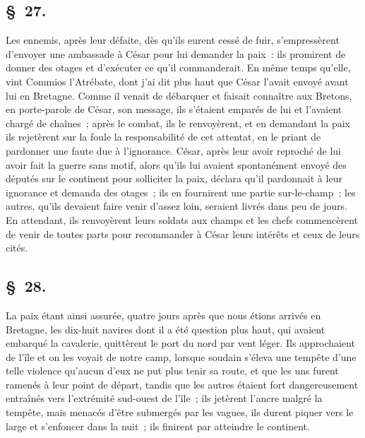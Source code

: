 \documentclass[french,twoside]{book} %
\begin{document}
\subsection[{§ 27.}]{ \textsc{§ 27.} }
\noindent Les ennemis, après leur défaite, dès qu’ils eurent cessé de fuir, s’empressèrent d’envoyer une ambassade à César pour lui demander la paix : ils promirent de donner des otages et d’exécuter ce qu’il commanderait. En même temps qu’elle, vint Commios l’Atrébate, dont j’ai dit plus haut que César l’avait envoyé avant lui en Bretagne. Comme il venait de débarquer et faisait connaître aux Bretons, en porte-parole de César, son message, ils s’étaient emparés de lui et l’avaient chargé de chaînes ; après le combat, ils le renvoyèrent, et en demandant la paix ils rejetèrent sur la foule la responsabilité de cet attentat, en le priant de pardonner une faute due à l’ignorance. César, après leur avoir reproché de lui avoir fait la guerre sans motif, alors qu’ils lui avaient spontanément envoyé des députés sur le continent pour solliciter la paix, déclara qu’il pardonnait à leur ignorance et demanda des otages ; ils en fournirent une partie sur-le-champ ; les autres, qu’ils devaient faire venir d’assez loin, seraient livrés dans peu de jours. En attendant, ils renvoyèrent leurs soldats aux champs et les chefs commencèrent de venir de toutes parts pour recommander à César leurs intérêts et ceux de leurs cités.
\subsection[{§ 28.}]{ \textsc{§ 28.} }
\noindent La paix étant ainsi assurée, quatre jours après que nous étions arrivés en Bretagne, les dix-huit navires dont il a été question plus haut, qui avaient embarqué la cavalerie, quittèrent le port du nord par vent léger. Ils approchaient de l’île et on les voyait de notre camp, lorsque soudain s’éleva une tempête d’une telle violence qu’aucun d’eux ne put plus tenir sa route, et que les uns furent ramenés à leur point de départ, tandis que les autres étaient fort dangereusement entraînés vers l’extrémité sud-ouest de l’île ; ils jetèrent l’ancre malgré la tempête, mais menacés d’être submergés par les vagues, ils durent piquer vers le large et s’enfoncer dans la nuit ; ils finirent par atteindre le continent.
\end{document}
